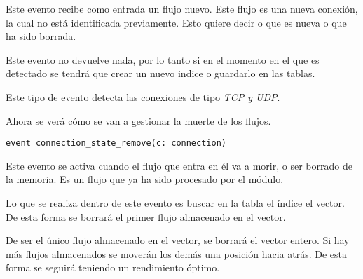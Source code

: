 \intro Este evento recibe como entrada un flujo nuevo. Este flujo es una nueva conexión, la cual no está identificada 
previamente. Esto quiere decir o que es nueva o que ha sido borrada.

\intro Este evento no devuelve nada, por lo tanto si en el momento en el que es detectado se tendrá que crear un nuevo 
indice o guardarlo en las tablas.

\intro Este tipo de evento detecta las conexiones de tipo \textit{TCP y UDP}.

\intro Ahora se verá cómo se van a gestionar la muerte de los flujos.

\begin{lstlisting}[style=CodigoC]
event connection_state_remove(c: connection)

\end{lstlisting}

\intro Este evento se activa cuando el flujo que entra en él va a morir, o ser borrado de la memoria. Es un flujo 
que ya ha sido procesado por el módulo.

\intro Lo que se realiza dentro de este evento es buscar en la tabla el índice el vector. De esta forma 
se borrará el primer flujo almacenado en el vector.

\intro De ser el único flujo almacenado en el vector, se borrará el vector entero. Si hay más flujos almacenados 
se moverán los demás una posición hacia atrás. De esta forma se seguirá teniendo un rendimiento óptimo.








